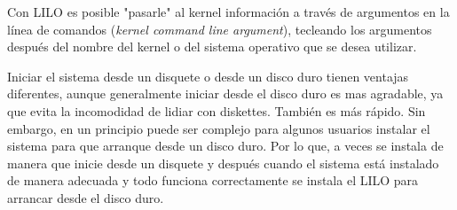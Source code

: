 \documentclass[12pt]{article}
\begin{document}
 Con LILO es posible "pasarle" al kernel información a través de
argumentos en la línea de comandos (\textit{kernel command line
argument}), tecleando los argumentos después del nombre del kernel o
del sistema operativo que se desea utilizar.  


 Iniciar el sistema desde un disquete o desde un disco duro tienen
ventajas diferentes, aunque generalmente iniciar desde el disco duro es mas
agradable, ya que evita la incomodidad de lidiar con diskettes. También es más
rápido. Sin embargo, en un principio puede ser complejo para algunos usuarios
instalar el sistema para que arranque desde un disco duro. Por lo que, a veces
se instala de manera que inicie desde un disquete y después cuando el sistema
está instalado de manera adecuada y todo funciona correctamente se instala el
LILO para arrancar desde el disco duro.  
\end{document}
